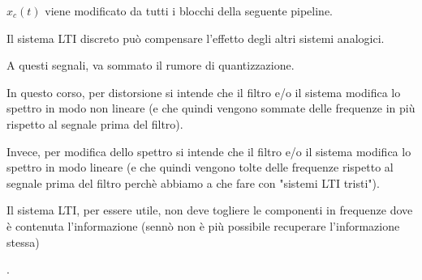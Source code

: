 $x_c \left(t\right)$ viene modificato da tutti i blocchi della seguente pipeline. \newline 

Il sistema LTI discreto può compensare l'effetto degli altri sistemi analogici. \newline 

A questi segnali, va sommato il rumore di quantizzazione. \newline 

\begin{tcolorbox}
    In questo corso, per distorsione si intende che il filtro e/o il sistema modifica lo spettro in modo non lineare (e che quindi vengono sommate delle frequenze in più rispetto al segnale prima del filtro). \newline 

    Invece, per modifica dello spettro si intende che il filtro e/o il sistema modifica lo spettro in modo lineare (e che quindi vengono tolte delle frequenze rispetto al segnale prima del filtro perchè abbiamo a che fare con "sistemi LTI tristi"). \newline 
    
    Il sistema LTI, per essere utile, non deve togliere le componenti in frequenze dove è contenuta l'informazione (sennò non è più possibile recuperare l'informazione stessa)
\end{tcolorbox}

\newpage 
. 
\newpage 


